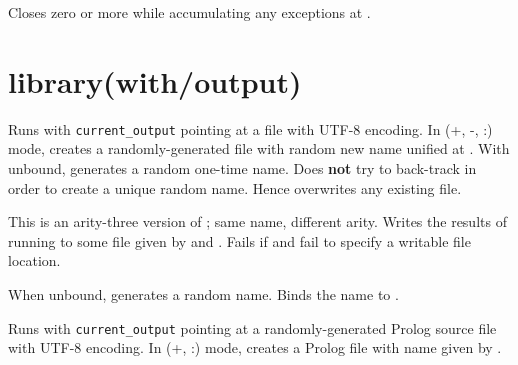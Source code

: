 \begin{description}
Closes zero or more  while accumulating any exceptions at
.
\end{description}

\chapter{library(with/output)}\label{sec:output}

\begin{description}
Runs  with \verb$current_output$ pointing at a file with UTF-8
encoding. In (+, -, :) mode, creates a randomly-generated file with
random new name unified at . With  unbound, generates a
random one-time name. Does \textbf{not} try to back-track in order to
create a unique random name. Hence overwrites any existing file.

This is an arity-three version of ; same name,
different arity. Writes the results of running  to some file
given by  and . Fails if  and  fail to
specify a writable file location.

When  unbound, generates a random name. Binds the name to .

Runs  with \verb$current_output$ pointing at a randomly-generated
Prolog source file with UTF-8 encoding. In (+, :) mode, creates a
Prolog file with name given by .
\end{description}

